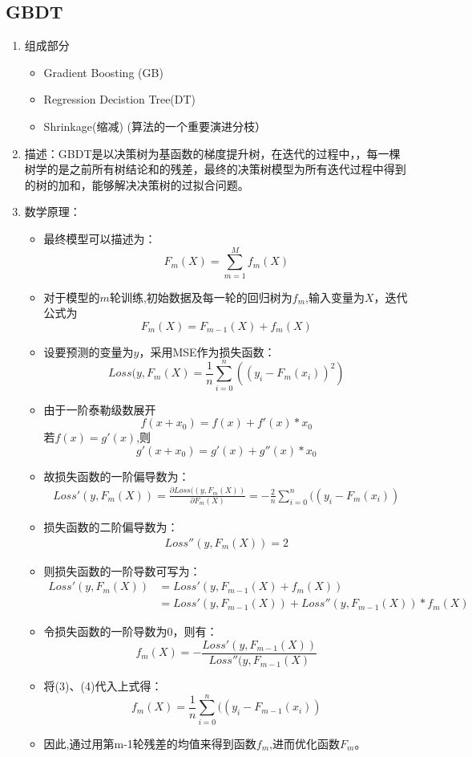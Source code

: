 \documentclass[UTF8]{article}%
\begin{document}
		\subsection{GBDT}
			\begin{enumerate}
				\item 组成部分
				\begin{itemize}
					\item Gradient Boosting (GB)
					\item Regression Decistion Tree(DT)
					\item Shrinkage(缩减) (算法的一个重要演进分枝）
				\end{itemize}
				\item 描述：GBDT是以决策树为基函数的梯度提升树，在迭代的过程中，，每一棵树学的是之前所有树结论和的残差，最终的决策树模型为所有迭代过程中得到的树的加和，能够解决决策树的过拟合问题。
				\item 数学原理：
				\begin{itemize}
					\item 最终模型可以描述为：$$F_m(X)=\sum_{m=1}^{M}f_m(X)$$
					\item 对于模型的$m$轮训练,初始数据及每一轮的回归树为$f_m$,输入变量为$X$，迭代公式为$$F_m(X)=F_{m-1}(X)+f_m(X)$$
					\item 设要预测的变量为$y$，采用MSE作为损失函数：$$Loss(y,F_m(X)=\frac{1}{n}\sum_{i=0}^{n}((y_i-F_m(x_i))^2)$$
					\item 由于一阶泰勒级数展开$$f(x+x_0)=f(x)+f'(x)*x_0$$
					若$f(x)=g'(x)$,则$$g'(x+x_0)=g'(x)+g''(x)*x_0$$
					\item 故损失函数的一阶偏导数为：
					\begin{align}
					Loss'(y,F_m(X))=\frac{\partial{Loss((y,F_m(X))}}{\partial{F_m(X)} }=-\frac{2}{n}\sum_{i=0}^{n}((y_i-F_m(x_i))
					\end{align}
					\item 损失函数的二阶偏导数为：
					\begin{align}
					Loss''(y,F_m(X))=2
					\end{align}
					
					\item 则损失函数的一阶导数可写为：
					\begin{align}
					Loss'(y,F_m(X))
					&=Loss'(y,F_{m-1}(X)+f_m(X))\\
					&=Loss'(y,F_{m-1}(X))+Loss''(y,F_{m-1}(X))*f_m(X)
					\end{align}
					\item 令损失函数的一阶导数为0，则有：$$f_m(X)=-\frac{Loss'(y,F_{m-1}(X))}{Loss''(y,F_{m-1}(X)}$$
					\item 将(3)、(4)代入上式得：
					$$f_m(X)=\frac{1}{n}\sum_{i=0}^{n}((y_i-F_{m-1}(x_i))$$
					\item 因此,通过用第m-1轮残差的均值来得到函数$f_m$,进而优化函数$F_m$。
				\end{itemize}
			\end{enumerate}
\end{document}
